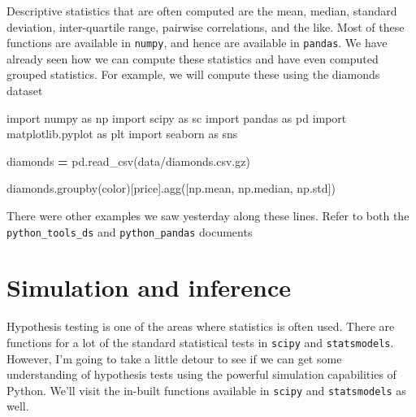 \documentclass[
  letterpaper,
]{scrbook}
\newenvironment{Shaded}{\begin{snugshade}}{\end{snugshade}}
\newcommand{\ImportTok}[1]{#1}
\newcommand{\NormalTok}[1]{#1}
\newcommand{\OperatorTok}[1]{\textcolor[rgb]{0.81,0.36,0.00}{\textbf{#1}}}
\newcommand{\StringTok}[1]{\textcolor[rgb]{0.31,0.60,0.02}{#1}}
\begin{document}
Descriptive statistics that are often computed are the mean, median, standard deviation, inter-quartile range, pairwise correlations, and the like. Most of these functions are available in \texttt{numpy}, and hence are available in \texttt{pandas}. We have already seen how we can compute these statistics and have even computed grouped statistics. For example, we will compute these using the diamonds dataset

\begin{Shaded}
\begin{Highlighting}[]
\ImportTok{import}\NormalTok{ numpy }\ImportTok{as}\NormalTok{ np}
\ImportTok{import}\NormalTok{ scipy }\ImportTok{as}\NormalTok{ sc}
\ImportTok{import}\NormalTok{ pandas }\ImportTok{as}\NormalTok{ pd}
\ImportTok{import}\NormalTok{ matplotlib.pyplot }\ImportTok{as}\NormalTok{ plt}
\ImportTok{import}\NormalTok{ seaborn }\ImportTok{as}\NormalTok{ sns}
\end{Highlighting}
\end{Shaded}

\begin{Shaded}
\begin{Highlighting}[]
\NormalTok{diamonds }\OperatorTok{=}\NormalTok{ pd.read\_csv(}\StringTok{\textquotesingle{}data/diamonds.csv.gz\textquotesingle{}}\NormalTok{)}
\end{Highlighting}
\end{Shaded}

\begin{Shaded}
\begin{Highlighting}[]
\NormalTok{diamonds.groupby(}\StringTok{\textquotesingle{}color\textquotesingle{}}\NormalTok{)[}\StringTok{\textquotesingle{}price\textquotesingle{}}\NormalTok{].agg([np.mean, np.median, np.std])}
\end{Highlighting}
\end{Shaded}

There were other examples we saw yesterday along these lines. Refer to both the \texttt{python\_tools\_ds} and \texttt{python\_pandas} documents

\hypertarget{simulation-and-inference}{%
\section{Simulation and inference}\label{simulation-and-inference}}

Hypothesis testing is one of the areas where statistics is often used. There are functions for a lot of the standard statistical tests in \texttt{scipy} and \texttt{statsmodels}. However, I'm going to take a little detour to see if we can get some understanding of hypothesis tests using the powerful simulation capabilities of Python. We'll visit the in-built functions available in \texttt{scipy} and \texttt{statsmodels} as well.
\end{document}
